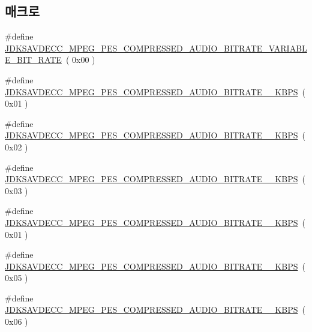 \subsection*{매크로}
\begin{DoxyCompactItemize}
\item 
\#define \hyperlink{group__mpeg__pes__compressed__audio__bitrate_ga064911aab9631789ff86a7d4c90ec4c1}{J\+D\+K\+S\+A\+V\+D\+E\+C\+C\+\_\+\+M\+P\+E\+G\+\_\+\+P\+E\+S\+\_\+\+C\+O\+M\+P\+R\+E\+S\+S\+E\+D\+\_\+\+A\+U\+D\+I\+O\+\_\+\+B\+I\+T\+R\+A\+T\+E\+\_\+\+V\+A\+R\+I\+A\+B\+L\+E\+\_\+\+B\+I\+T\+\_\+\+R\+A\+TE}~( 0x00 )
\item 
\#define \hyperlink{group__mpeg__pes__compressed__audio__bitrate_ga3fe908e2ea0af7da9a3da4a1e07cf713}{J\+D\+K\+S\+A\+V\+D\+E\+C\+C\+\_\+\+M\+P\+E\+G\+\_\+\+P\+E\+S\+\_\+\+C\+O\+M\+P\+R\+E\+S\+S\+E\+D\+\_\+\+A\+U\+D\+I\+O\+\_\+\+B\+I\+T\+R\+A\+T\+E\+\_\+\_\+\+K\+B\+PS}~( 0x01 )
\item 
\#define \hyperlink{group__mpeg__pes__compressed__audio__bitrate_gac2c1f4a464bddee88db61e65605506fb}{J\+D\+K\+S\+A\+V\+D\+E\+C\+C\+\_\+\+M\+P\+E\+G\+\_\+\+P\+E\+S\+\_\+\+C\+O\+M\+P\+R\+E\+S\+S\+E\+D\+\_\+\+A\+U\+D\+I\+O\+\_\+\+B\+I\+T\+R\+A\+T\+E\+\_\+\_\+\+K\+B\+PS}~( 0x02 )
\item 
\#define \hyperlink{group__mpeg__pes__compressed__audio__bitrate_ga8898d1b0fbfc554a0f551e02443293b0}{J\+D\+K\+S\+A\+V\+D\+E\+C\+C\+\_\+\+M\+P\+E\+G\+\_\+\+P\+E\+S\+\_\+\+C\+O\+M\+P\+R\+E\+S\+S\+E\+D\+\_\+\+A\+U\+D\+I\+O\+\_\+\+B\+I\+T\+R\+A\+T\+E\+\_\+\_\+\+K\+B\+PS}~( 0x03 )
\item 
\#define \hyperlink{group__mpeg__pes__compressed__audio__bitrate_ga81d531f1c8fb1025e48e58c9435c03e6}{J\+D\+K\+S\+A\+V\+D\+E\+C\+C\+\_\+\+M\+P\+E\+G\+\_\+\+P\+E\+S\+\_\+\+C\+O\+M\+P\+R\+E\+S\+S\+E\+D\+\_\+\+A\+U\+D\+I\+O\+\_\+\+B\+I\+T\+R\+A\+T\+E\+\_\+\_\+\+K\+B\+PS}~( 0x01 )
\item 
\#define \hyperlink{group__mpeg__pes__compressed__audio__bitrate_ga5d3403769d525d5a3500ee4cf9bf1c9f}{J\+D\+K\+S\+A\+V\+D\+E\+C\+C\+\_\+\+M\+P\+E\+G\+\_\+\+P\+E\+S\+\_\+\+C\+O\+M\+P\+R\+E\+S\+S\+E\+D\+\_\+\+A\+U\+D\+I\+O\+\_\+\+B\+I\+T\+R\+A\+T\+E\+\_\+\_\+\+K\+B\+PS}~( 0x05 )
\item 
\#define \hyperlink{group__mpeg__pes__compressed__audio__bitrate_gafc0e0fe55e93571d7842c6aa76fea9dc}{J\+D\+K\+S\+A\+V\+D\+E\+C\+C\+\_\+\+M\+P\+E\+G\+\_\+\+P\+E\+S\+\_\+\+C\+O\+M\+P\+R\+E\+S\+S\+E\+D\+\_\+\+A\+U\+D\+I\+O\+\_\+\+B\+I\+T\+R\+A\+T\+E\+\_\+\_\+\+K\+B\+PS}~( 0x06 )
\item 

\end{DoxyCompactItemize}
